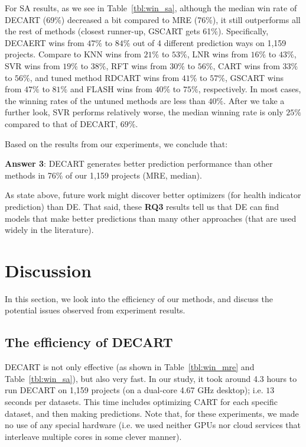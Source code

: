 \documentclass[smallextended]{svjour3}
\newcommand{\tbl}[1]{Table~\ref{tbl:#1}}
\newcommand{\respto}[1]{
\fcolorbox{black}{black!15}{%
\label{resp:#1}%
\bf\scriptsize R{#1}}}
\newcommand{\BLUE}{\color{blue}}
\newcommand{\BLACK}{\color{black}}
\begin{document}
For SA results, as we see in \tbl{win_sa}, although the median win rate of DECART (69\%) decreased a bit compared to MRE (76\%), it still outperforms all the rest of methods (closest runner-up, GSCART gets 61\%). Specifically, DECAERT wins from $47\%$ to $84\%$ out of 4 different prediction ways on 1,159 projects. Compare to KNN wins from $21\%$ to $53\%$, LNR wins from $16\%$ to $43\%$, SVR wins from $19\%$ to $38\%$, RFT wins from $30\%$ to $56\%$, CART wins from $33\%$ to $56\%$, and tuned method RDCART wins from $41\%$ to $57\%$, GSCART wins from $47\%$ to $81\%$ and FLASH wins from $40\%$ to $75\%$, respectively. In most cases, the winning rates of the untuned methods  are less than $40\%$. After we take a further look, SVR performs relatively worse, the median winning rate is only $25\%$ compared to that of DECART, $69\%$. 



Based on the results from our experiments, we conclude that:
 

\begin{blockquote}
\noindent
\textbf{Answer 3}: 
DECART generates better prediction performance than other methods in 76\% of our 1,159 projects (MRE, median).
\end{blockquote}


\respto{2G4} \BLUE As state above, future work
might discover better optimizers
(for health indicator prediction) than DE. That said, these {\bf RQ3}
results tell us that DE   
 can find models that make better predictions  than many other approaches (that are used widely in the   literature). 
\BLACK





 



\section{Discussion}
\label{sect:discu}

In this section, we look into the efficiency of our methods, and discuss the potential issues observed from experiment results.
\BLACK

\subsection{The efficiency of DECART}
 DECART   is not only effective (as shown in \tbl{win_mre} and \tbl{win_sa}), but also  very fast. In our study, it took around 4.3 hours to run DECART on 1,159 projects (on a dual-core 4.67 GHz desktop);
i.e. $13$ seconds per datasets. This time includes optimizing CART for each 
specific dataset, and then making predictions. Note that, for these experiments, we made no use of any special hardware (i.e. we used neither GPUs nor cloud services that interleave multiple cores in some clever manner).
\end{document}
